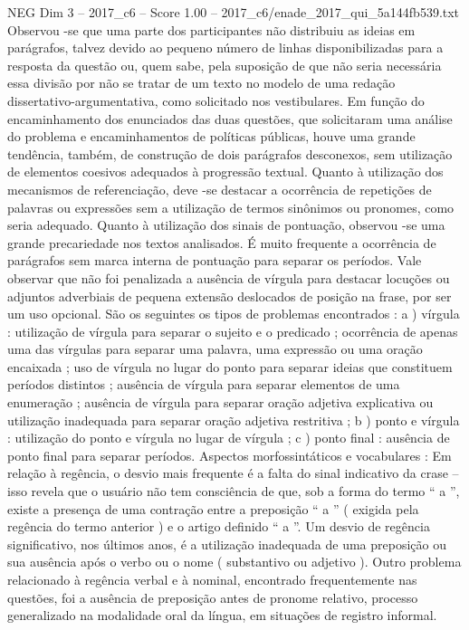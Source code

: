 \begin{textsample}{NEG Dim 3 – 2017\_c6 – Score 1.00 – 2017\_c6/enade\_2017\_qui\_5a144fb539.txt}
Observou -se que uma parte dos participantes não distribuiu as ideias em parágrafos, talvez devido ao pequeno número de linhas disponibilizadas para a resposta da questão ou, quem sabe, pela suposição de que não seria necessária essa divisão por não se tratar de um texto no modelo de uma redação dissertativo-argumentativa, como solicitado nos vestibulares.
Em função do encaminhamento dos enunciados das duas questões, que solicitaram uma análise do problema e encaminhamentos de políticas públicas, houve uma grande tendência, também, de construção de dois parágrafos desconexos, sem utilização de elementos coesivos adequados à progressão textual.
Quanto à utilização dos mecanismos de referenciação, deve -se destacar a ocorrência de repetições de palavras ou expressões sem a utilização de termos sinônimos ou pronomes, como seria adequado.
Quanto à utilização dos sinais de pontuação, observou -se uma grande precariedade nos textos analisados.
É muito frequente a ocorrência de parágrafos sem marca interna de pontuação para separar os períodos.
Vale observar que não foi penalizada a ausência de vírgula para destacar locuções ou adjuntos adverbiais de pequena extensão deslocados de posição na frase, por ser um uso opcional.
São os seguintes os tipos de problemas encontrados : a ) vírgula : utilização de vírgula para separar o sujeito e o predicado ; ocorrência de apenas uma das vírgulas para separar uma palavra, uma expressão ou uma oração encaixada ; uso de vírgula no lugar do ponto para separar ideias que constituem períodos distintos ; ausência de vírgula para separar elementos de uma enumeração ; ausência de vírgula para separar oração adjetiva explicativa ou utilização inadequada para separar oração adjetiva restritiva ; b ) ponto e vírgula : utilização do ponto e vírgula no lugar de vírgula ; c ) ponto final : ausência de ponto final para separar períodos.
Aspectos morfossintáticos e vocabulares : Em relação à regência, o desvio mais frequente é a falta do sinal indicativo da crase – isso revela que o usuário não tem consciência de que, sob a forma do termo “ a ”, existe a presença de uma contração entre a preposição “ a ” ( exigida pela regência do termo anterior ) e o artigo definido “ a ”.
Um desvio de regência significativo, nos últimos anos, é a utilização inadequada de uma preposição ou sua ausência após o verbo ou o nome ( substantivo ou adjetivo ).
Outro problema relacionado à regência verbal e à nominal, encontrado frequentemente nas questões, foi a ausência de preposição antes de pronome relativo, processo generalizado na modalidade oral da língua, em situações de registro informal.

\end{textsample}
